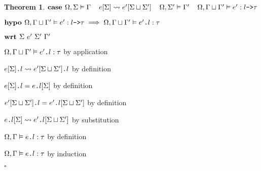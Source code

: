 \documentclass[acmsmall]{acmart}
\theoremstyle{definition}
\newtheorem{theorem}{Theorem}[section]
\begin{document}
\begin{theorem}
    \item \Z $\textbf{case }
      \Omega, \Sigma \vDash \Gamma
      \hspace{4mm}
      e[\Sigma] \rightsquigarrow e'[\Sigma \sqcup \Sigma']
      \hspace{4mm}
      \Omega, \Sigma' \vDash \Gamma'
      \hspace{4mm}
      \Omega, \Gamma \sqcup \Gamma' \vDash e' : \texttt{$l$->$\tau$}
    $
    \item \Z $\textbf{hypo }
      \Omega, \Gamma \sqcup \Gamma' \vDash e' : \texttt{$l$->$\tau$}
      \implies
      \Omega, \Gamma \sqcup \Gamma' \vDash \texttt{$e'$.$l$} : \tau
    $
    \item \Z $\textbf{wrt }
      \Sigma\ e'\ \Sigma'\ \Gamma'
    $
      \item \Z\Z $
        \Omega, \Gamma \sqcup \Gamma' \vDash \texttt{$e'$.$l$} : \tau
      $ by application
      \item \Z\Z $
        \texttt{$e[\Sigma]$.$l$} \rightsquigarrow \texttt{$e'[\Sigma \sqcup \Sigma']$.$l$}
      $ by definition 
      \item \Z\Z $
        \texttt{$e[\Sigma]$.$l$} = \texttt{$e$.$l$}[\Sigma]
      $ by definition 
      \item \Z\Z $
        \texttt{$e'[\Sigma \sqcup \Sigma']$.$l$} = \texttt{$e'$.$l$}[\Sigma \sqcup \Sigma']
      $ by definition 
      \item \Z\Z $
        \texttt{$e$.$l$}[\Sigma] \rightsquigarrow \texttt{$e'$.$l$}[\Sigma \sqcup \Sigma']
      $ by substitution 
      \item \Z\Z $
        \Omega, \Gamma \vDash \texttt{$e$.$l$} : \tau 
      $ by definition 

    \item \Z $
      \Omega, \Gamma \vDash \texttt{$e$.$l$} : \tau 
    $ by induction 
  \item $\square$
\end{theorem}
\end{document}
